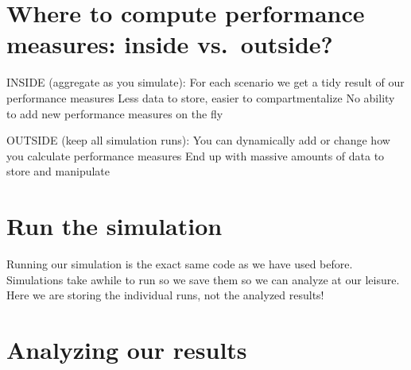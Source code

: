\documentclass[
]{book}
\newenvironment{Shaded}{\begin{snugshade}}{\end{snugshade}}
\newcommand{\AttributeTok}[1]{\textcolor[rgb]{0.77,0.63,0.00}{#1}}
\newcommand{\DecValTok}[1]{\textcolor[rgb]{0.00,0.00,0.81}{#1}}
\newcommand{\FunctionTok}[1]{\textcolor[rgb]{0.00,0.00,0.00}{#1}}
\newcommand{\NormalTok}[1]{#1}
\newcommand{\OtherTok}[1]{\textcolor[rgb]{0.56,0.35,0.01}{#1}}
\newcommand{\SpecialCharTok}[1]{\textcolor[rgb]{0.00,0.00,0.00}{#1}}
\newcommand{\StringTok}[1]{\textcolor[rgb]{0.31,0.60,0.02}{#1}}
\begin{document}
\hypertarget{where-to-compute-performance-measures-inside-vs.-outside}{%
\section{Where to compute performance measures: inside vs.~outside?}\label{where-to-compute-performance-measures-inside-vs.-outside}}

INSIDE (aggregate as you simulate):
For each scenario we get a tidy result of our performance measures
Less data to store, easier to compartmentalize
No ability to add new performance measures on the fly

OUTSIDE (keep all simulation runs):
You can dynamically add or change how you calculate performance measures
End up with massive amounts of data to store and manipulate

\hypertarget{run-the-simulation}{%
\section{Run the simulation}\label{run-the-simulation}}

Running our simulation is the exact same code as we have used before.
Simulations take awhile to run so we save them so we can analyze at our leisure.
Here we are storing the individual runs, not the analyzed results!

\begin{Shaded}
\end{Shaded}

\hypertarget{analyzing-our-results}{%
\section{Analyzing our results}\label{analyzing-our-results}}
\end{document}
